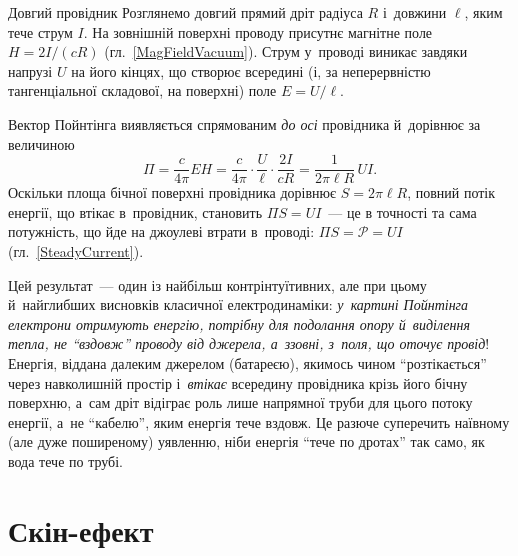 \begin{Example}{Довгий провідник}
	Розглянемо довгий прямий дріт радіуса $R$ і~довжини $\ell$, яким тече струм $I$.
	На зовнішній поверхні проводу присутнє магнітне поле $H = 2I/(cR)$
	(гл.~\ref{MagFieldVacuum}). Струм у~проводі виникає завдяки напрузі $U$ на його
	кінцях, що створює всередині (і, за неперервністю тангенціальної складової, на
	поверхні) поле $E = U/\ell$.

	\begin{center}
	\end{center}

	Вектор Пойнтінга виявляється спрямованим \emph{до осі} провідника й~дорівнює за
	величиною
	\begin{equation*}
		\Pi = \frac{c}{4\pi}EH = \frac{c}{4\pi}\cdot\frac{U}{\ell}\cdot\frac{2I}{cR} = \frac1{2\pi\ell R}\,UI.
	\end{equation*}
	Оскільки площа бічної поверхні провідника дорівнює $S=2\pi\ell R$, повний потік
	енергії, що втікає в~провідник, становить $\Pi S = UI$~--- це в точності та сама
	потужність, що йде на джоулеві втрати в~проводі: $\Pi S = \mathcal P = UI$
	(гл.~\ref{SteadyCurrent}).
\end{Example}

\begin{Attention}
	Цей результат~--- один із найбільш контрінтуїтивних, але при цьому й~найглибших
	висновків класичної електродинаміки: \emph{у~картині Пойнтінга електрони отримують
	енергію, потрібну для подолання опору й~виділення тепла, не \enquote{вздовж} проводу
	від джерела, а~ззовні, з~поля, що оточує провід}! Енергія, віддана далеким джерелом
	(батареєю), якимось чином \enquote{розтікається} через навколишній простір
	і~\emph{втікає} всередину провідника крізь його бічну поверхню, а~сам дріт відіграє
	роль лише напрямної труби для цього потоку енергії, а~не \enquote{кабелю}, яким
	енергія тече вздовж. Це разюче суперечить наївному (але дуже поширеному) уявленню,
	ніби енергія \enquote{тече по дротах} так само, як вода тече по трубі.
\end{Attention}


\section{Скін-ефект}\hypertarget{skin-effect}{}


